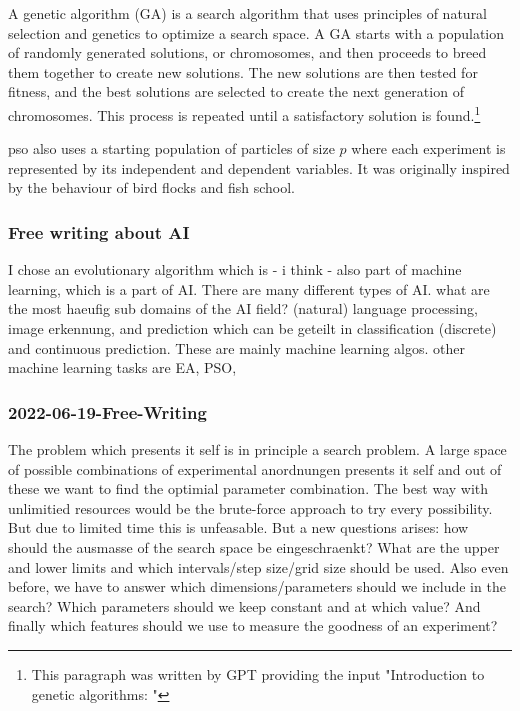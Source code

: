 A genetic algorithm (GA) is a search algorithm that uses principles of natural selection and genetics to optimize a search space. A GA starts with a population of randomly generated solutions, or chromosomes, and then proceeds to breed them together to create new solutions. The new solutions are then tested for fitness, and the best solutions are selected to create the next generation of chromosomes. This process is repeated until a satisfactory solution is found.\footnote{This paragraph was written by GPT\cite{Liu2021gpt} providing the input "Introduction to genetic algorithms: "}

\Gls{pso} also uses a starting population of particles of size $p$ where each experiment 
is represented by its independent and dependent variables. 
It was originally inspired by the behaviour of bird flocks and fish school.

\subsubsection{Free writing about AI}
I chose an evolutionary algorithm which is - i think - also part of machine learning, 
which is a part of AI. 
There are many different types of AI. what are the most haeufig sub domains of the AI field? 
(natural) language processing, image erkennung, and prediction which can be geteilt in 
classification (discrete) and continuous prediction. 
These are mainly machine learning algos. other machine learning tasks are EA, PSO, 


\subsubsection{2022-06-19-Free-Writing}
The problem which presents it self is in principle a search problem.
A large space of possible combinations of experimental anordnungen presents it self
and out of these we want to find the optimial parameter combination. 
The best way with unlimitied resources would be the brute-force approach to try every possibility. 
But due to limited time this is unfeasable. 
But a new questions arises: how should the ausmasse of the search space be eingeschraenkt? 
What are the upper and lower limits and which intervals/step size/grid size should be used. 
Also even before, we have to answer which dimensions/parameters should we include in the search? 
Which parameters should we keep constant and at which value? 
And finally which features should we use to measure the goodness of an experiment? 

